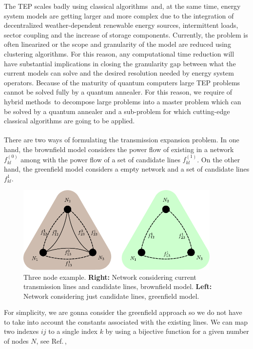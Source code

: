 The TEP scales badly using classical algorithms\,\cite{Oertel2014ComplexityEvaluation} and, at the same time, energy system models are getting larger and more complex due to the integration of decentralized weather-dependent renewable energy sources, intermittent loads, sector coupling and the increase of storage components. Currently, the problem is often linearized or the scope and granularity of the model are reduced using clustering algorithms. For this reason, any computational time reduction will have substantial implications in closing the granularity gap between what the current models can solve and the desired resolution needed by energy system operators. Because of the maturity of quantum computers large TEP problems cannot be solved fully by a quantum annealer. For this reason, we require of hybrid methods\,\cite{Ding2019ImplementationDesign,Zhao2021HybridProgrammingb} to decompose large problems into a master problem which can be solved by a quantum annealer and a sub-problem for which cutting-edge classical algorithms are going to be applied.\\\\
There are two ways of formulating the transmission expansion problem. In one hand, the brownfield model considers the power flow of existing in a network $f_{kl}^{(0)}$ among with the power flow of a set of candidate lines $f_{kl}^{(1)}$. On the other hand, the greenfield model considers a empty network and a set of candidate lines $f_{kl}^{1}$.
\begin{figure}[H]
  \begin{center}
\includegraphics[width=0.9\textwidth]{Figures/3NodeBrownGreen.pdf}
  \end{center}
  \caption{Three node example. \textbf{Right:} Network considering current transmission lines and candidate lines, brownfield model. \textbf{Left:} Network considering just candidate lines, greenfield model.}
  \label{fig: ThreeNode}
\end{figure}
For simplicity, we are gonna consider the greenfield approach so we do not have to take into account the constants associated with the existing lines. We can map two indexes $ij$ to a single index $k$ by using a bijective function for a given number of nodes $N$, see Ref.\,\cite{Jain2021SolvingComputer},
